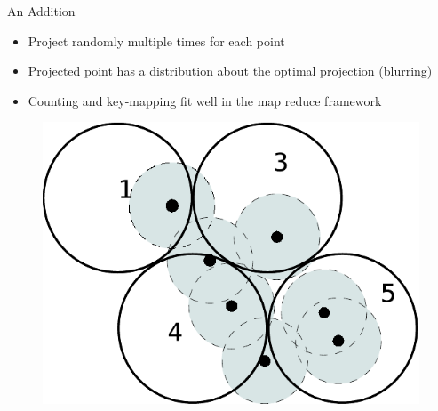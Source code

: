 \documentclass{beamer}
\begin{document}
\begin{frame}{An Addition}
\begin{itemize}
  \item Project randomly multiple times for each point
  \item Projected point has a distribution about the optimal projection (blurring)
  \item Counting and key-mapping fit well in the map reduce framework
 \end{itemize}
  \begin{figure}
  \centering \includegraphics[scale=.50]{doc/randproj}
\end{figure}
\end{frame}
\end{document}
